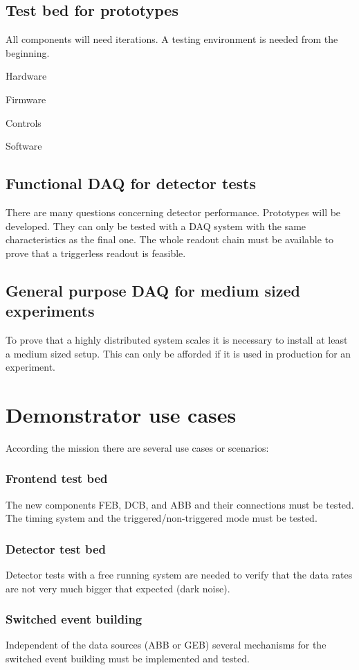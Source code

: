 \subsection{Test bed for prototypes}
All components will need iterations. A testing environment is
needed from the beginning.
\begin{compactitem}[$\bullet$]
\item Hardware
\item Firmware
\item Controls
\item Software
\end{compactitem}
\subsection{Functional DAQ for detector tests}
There are many questions concerning detector performance.
Prototypes will be developed. They can only be tested with a DAQ
system with the same characteristics as the final one. The whole
readout chain must be available to prove that a triggerless
readout is feasible.
\subsection{General purpose DAQ for medium sized experiments}
To prove that a highly distributed system scales it is necessary
to install at least a medium sized setup. This can only be
afforded if it is used in production for an experiment.

\section{Demonstrator use cases}
According the mission there are several use cases or scenarios:
\subsubsection{Frontend test bed}
The new components FEB, DCB, and ABB and their connections must be tested.
The timing system and the triggered/non-triggered mode must be tested.
\subsubsection{Detector test bed}
Detector tests with a free running system are needed to verify that the data rates
are not very much bigger that expected (dark noise).
\subsubsection{Switched event building}
Independent of the data sources (ABB or GEB) several mechanisms for the switched
event building must be implemented and tested.
